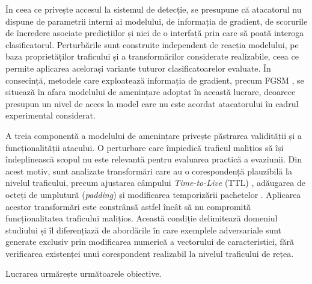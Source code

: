 În ceea ce privește accesul la sistemul de detecție, se presupune că atacatorul nu dispune de parametrii interni ai modelului, de informația de gradient, de scorurile de încredere asociate predicțiilor și nici de o interfață prin care să poată interoga clasificatorul. Perturbările sunt construite independent de reacția modelului, pe baza proprietăților traficului și a transformărilor considerate realizabile, ceea ce permite aplicarea acelorași variante tuturor clasificatoarelor evaluate. În consecință, metodele care exploatează informația de gradient, precum FGSM \cite{goodfellow2015explaining}, se situează în afara modelului de amenințare adoptat în această lucrare, deoarece presupun un nivel de acces la model care nu este acordat atacatorului în cadrul experimental considerat.

A treia componentă a modelului de amenințare privește păstrarea validității și a funcționalității atacului. O perturbare care împiedică traficul malițios să își îndeplinească scopul nu este relevantă pentru evaluarea practică a evaziunii. Din acest motiv, sunt analizate transformări care au o corespondență plauzibilă la nivelul traficului, precum ajustarea câmpului \textit{Time-to-Live} (TTL) \cite{gont2011rfc6274}, adăugarea de octeți de umplutură (\textit{padding}) \cite{okada2025xai} și modificarea temporizării pachetelor \cite{sharon2022tantra}. Aplicarea acestor transformări este constrânsă astfel încât să nu compromită funcționalitatea traficului malițios. Această condiție delimitează domeniul studiului și îl diferențiază de abordările în care exemplele adversariale sunt generate exclusiv prin modificarea numerică a vectorului de caracteristici, fără verificarea existenței unui corespondent realizabil la nivelul traficului de rețea.

Lucrarea urmărește următoarele obiective.

